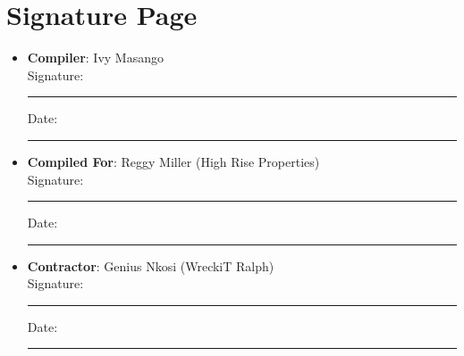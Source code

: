 \documentclass[11pt]{article}
\newcommand{\clientName}{High Rise Properties}
\newcommand{\compilerName}{Ivy Masango}
\newcommand{\contractorName}{WreckiT Ralph}
\begin{document}
\section{Signature Page}
\begin{itemize}
  \item \textbf{Compiler}: \compilerName \\
    Signature: \rule{5cm}{0.4pt} \quad Date: \rule{3cm}{0.4pt}
  \item \textbf{Compiled For}: Reggy Miller (\clientName) \\
    Signature: \rule{5cm}{0.4pt} \quad Date: \rule{3cm}{0.4pt}
  \item \textbf{Contractor}: Genius Nkosi (\contractorName) \\
    Signature: \rule{5cm}{0.4pt} \quad Date: \rule{3cm}{0.4pt}
\end{itemize}
\end{document}
